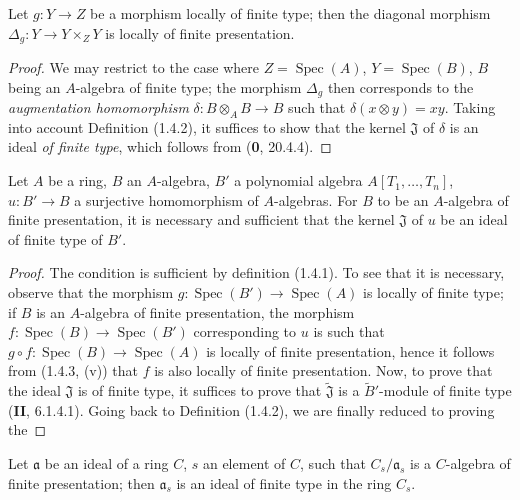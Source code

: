 \begin{corollary}[1.4.3.1]
\label{IV.1.4.3.1}
Let $g:Y\to Z$ be a morphism locally of finite type; then the diagonal
morphism $\Delta_g:Y\to Y\times_ZY$ is locally of finite presentation.
\end{corollary}


\begin{proof}
We may restrict to the case where $Z=\operatorname{Spec}(A)$, $Y=\operatorname{Spec}(B)$, $B$ being an
$A$-algebra of finite type; the morphism $\Delta_g$ then corresponds to
the \emph{augmentation homomorphism} $\delta:B\otimes_AB\to B$ such that
$\delta(x\otimes y)=xy$. Taking into account Definition (1.4.2), it suffices
to show that the kernel $\mathfrak J$ of $\delta$ is an ideal \emph{of finite
type}, which follows from (\textbf{0}, 20.4.4).
\end{proof}

\begin{proposition}[1.4.4]
\label{IV.1.4.4}
Let $A$ be a ring, $B$ an $A$-algebra, $B'$ a polynomial algebra
$A[T_1,\ldots,T_n]$, $u:B'\to B$ a surjective homomorphism of
$A$-algebras. For $B$ to be an $A$-algebra of finite presentation, it is
necessary and sufficient that the kernel $\mathfrak J$ of $u$ be an ideal of
finite type of $B'$.
\end{proposition}

\begin{proof}
The condition is sufficient by definition (1.4.1). To see that it is
necessary, observe that the morphism $g:\operatorname{Spec}(B')\to\operatorname{Spec}(A)$ is
locally of finite type; if $B$ is an $A$-algebra of finite presentation,
the morphism $f:\operatorname{Spec}(B)\to\operatorname{Spec}(B')$ corresponding to $u$ is such that
$g\circ f:\operatorname{Spec}(B)\to\operatorname{Spec}(A)$ is locally of finite presentation, hence it
follows from (1.4.3, (v)) that $f$ is also locally of finite presentation.
Now, to prove that the ideal $\mathfrak J$ is of finite type, it suffices to
prove that $\widetilde{\mathfrak J}$ is a $\widetilde{B}'$-module of finite
type (\textbf{II}, 6.1.4.1). Going back to Definition (1.4.2), we are finally reduced
to proving the
\end{proof}

\begin{lemma}[1.4.4.1]
\label{IV.1.4.4.1}
Let $\mathfrak a$ be an ideal of a ring $C$, $s$ an element of $C$, such that
$C_s/\mathfrak a_s$ is a $C$-algebra of finite presentation; then
$\mathfrak a_s$ is an ideal of finite type in the ring $C_s$.
\end{lemma}

